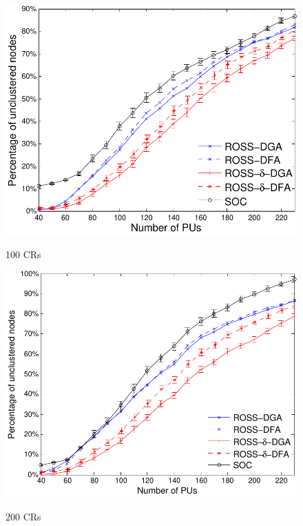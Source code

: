 \documentclass[10pt,journal,compsoc]{IEEEtran}
\theoremstyle{mytheoremstyle}
\theoremstyle{mytheoremstyle}
\theoremstyle{mytheoremstyle}
\begin{document}
\begin{figure}[t]
\begin{multicols}{3}
    \includegraphics[width=\linewidth]{survival_rate_100_edge50.pdf}\par\caption{100 CRs}\label{singleton_clusters_100}
    \includegraphics[width=\linewidth]{survival_rate_200_edge50.pdf}\par\caption{200 CRs}\label{singleton_clusters_200}

\end{multicols}
\end{figure}
\end{document}
